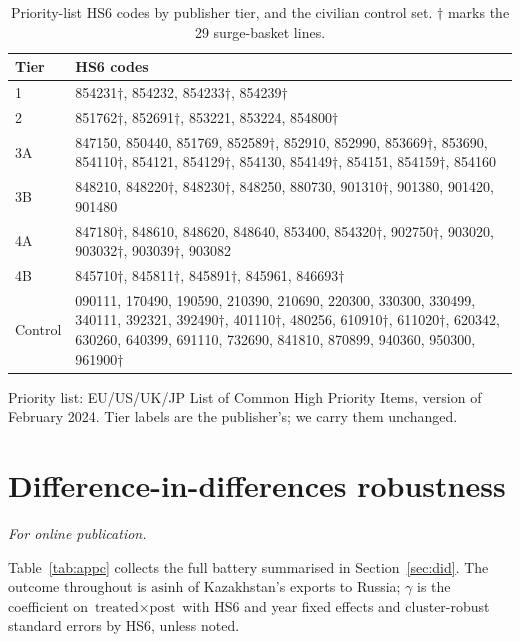 \documentclass[12pt]{article}
\begin{document}
\begin{table}[htbp]
\centering
\caption{Priority-list HS6 codes by publisher tier, and the civilian control set.
$\dagger$ marks the 29 surge-basket lines.}
\label{tab:appb}
\footnotesize
\begin{tabular}{@{}p{1.6cm}p{12.4cm}@{}}
\toprule
Tier & HS6 codes \\
\midrule
1 & 854231$\dagger$, 854232, 854233$\dagger$, 854239$\dagger$ \\
2 & 851762$\dagger$, 852691$\dagger$, 853221, 853224, 854800$\dagger$ \\
3A & 847150, 850440, 851769, 852589$\dagger$, 852910, 852990, 853669$\dagger$, 853690, 854110$\dagger$, 854121, 854129$\dagger$, 854130, 854149$\dagger$, 854151, 854159$\dagger$, 854160 \\
3B & 848210, 848220$\dagger$, 848230$\dagger$, 848250, 880730, 901310$\dagger$, 901380, 901420, 901480 \\
4A & 847180$\dagger$, 848610, 848620, 848640, 853400, 854320$\dagger$, 902750$\dagger$, 903020, 903032$\dagger$, 903039$\dagger$, 903082 \\
4B & 845710$\dagger$, 845811$\dagger$, 845891$\dagger$, 845961, 846693$\dagger$ \\
\midrule
Control & 090111, 170490, 190590, 210390, 210690, 220300, 330300, 330499, 340111, 392321, 392490$\dagger$, 401110$\dagger$, 480256, 610910$\dagger$, 611020$\dagger$, 620342, 630260, 640399, 691110, 732690, 841810, 870899, 940360, 950300, 961900$\dagger$ \\
\bottomrule
\end{tabular}

\vspace{2pt}
\footnotesize Priority list: EU/US/UK/JP List of Common High Priority Items, version of
February 2024. Tier labels are the publisher's; we carry them unchanged.
\end{table}

\section{Difference-in-differences robustness}\label{app:did}
\emph{For online publication.}

\medskip
Table~\ref{tab:appc} collects the full battery summarised in Section~\ref{sec:did}. The outcome
throughout is $\text{asinh}$ of Kazakhstan's exports to Russia; $\gamma$ is the coefficient on
$\text{treated}\times\text{post}$ with HS6 and year fixed effects and cluster-robust standard
errors by HS6, unless noted.
\end{document}
